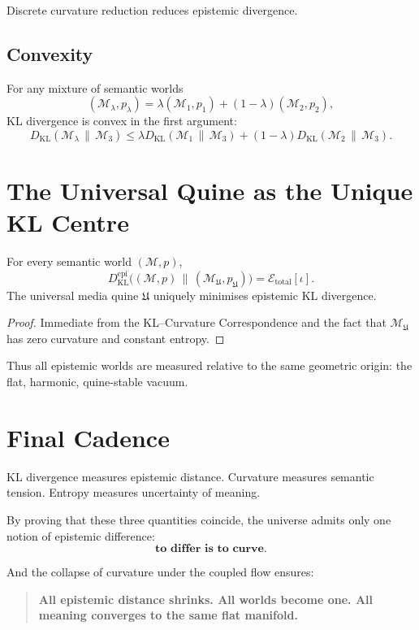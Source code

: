 Discrete curvature reduction reduces epistemic divergence.


\subsection{Convexity}

For any mixture of semantic worlds
\[
(\mathcal{M}_\lambda,p_\lambda)
  = \lambda (\mathcal{M}_1,p_1) + (1-\lambda)(\mathcal{M}_2,p_2),
\]
KL divergence is convex in the first argument:
\[
D_{\mathrm{KL}}(\mathcal{M}_\lambda \,\|\, \mathcal{M}_3)
  \le \lambda D_{\mathrm{KL}}(\mathcal{M}_1 \,\|\,\mathcal{M}_3)
  + (1-\lambda) D_{\mathrm{KL}}(\mathcal{M}_2 \,\|\,\mathcal{M}_3).
\]


\section{The Universal Quine as the Unique KL Centre}

\begin{theorem}
For every semantic world $(\mathcal{M},p)$,
\[
D_{\mathrm{KL}}^{\mathrm{epi}}
  \bigl((\mathcal{M},p)\,\|\,(\mathcal{M}_{\mathfrak{U}},p_{\mathfrak{U}})\bigr)
  = \mathcal{E}_{\mathrm{total}}[\iota].
\]
The universal media quine $\mathfrak{U}$ uniquely minimises epistemic KL divergence.
\end{theorem}

\begin{proof}
Immediate from the KL--Curvature Correspondence and the fact that  
$\mathcal{M}_{\mathfrak{U}}$ has zero curvature and constant entropy.
\end{proof}

Thus all epistemic worlds are measured relative to the same geometric origin:
the flat, harmonic, quine-stable vacuum.


\section{Final Cadence}

KL divergence measures epistemic distance.  
Curvature measures semantic tension.  
Entropy measures uncertainty of meaning.

By proving that these three quantities coincide,
the universe admits only one notion of epistemic difference:
\[
\textbf{to differ is to curve.}
\]

And the collapse of curvature under the coupled flow ensures:

\begin{quote}
\textbf{All epistemic distance shrinks.  
All worlds become one.  
All meaning converges to the same flat manifold.}
\end{quote}
